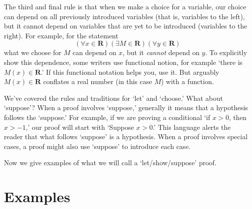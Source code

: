 \documentclass[12pt,fleqn]{article}
\newcommand{\reals}{\mathbf{R}}
\newcounter{ex}\setcounter{ex}{0}
\begin{document}
The third and final rule is that when we  make a choice for a variable, our choice can depend on all previously
introduced variables (that is, variables to the left), but it cannot  depend on variables that are yet to be introduced (variables to the right). 
For example, for the statement
\begin{equation*}
   \left(\forall x \in \reals\right)
   \left(\exists M \in \reals\right)
   \left(\forall y \in \reals \right)
 \end{equation*}
 what we choose for $M$ can depend on $x$, but it \emph{cannot}  depend on $y$. To explicitly show this dependence, some writers
 use functional notion, for example `there is $M(x) \in \reals$.'  If this functional notation helps you, use it. But arguably  
 $M(x) \in \reals$ conflates a real number (in this case $M$) with a function.

We've covered the rules and traditions for `let' and `choose.' What about `suppose'?  When a proof involves `suppose,' generally 
it means that a hypothesis follows the `suppose.' For example, if we are proving a conditional `if $x > 0$, then $x > -1$,' our proof will start with 
`Suppose $x > 0$.' This language alerts the reader that what follows `suppose' is a hypothesis.  When a proof involves special cases, 
a proof might also use `suppose' to introduce each case.

Now we give examples of what we will call a `let/show/suppose' proof.

\section{Examples}
            
\end{document}

